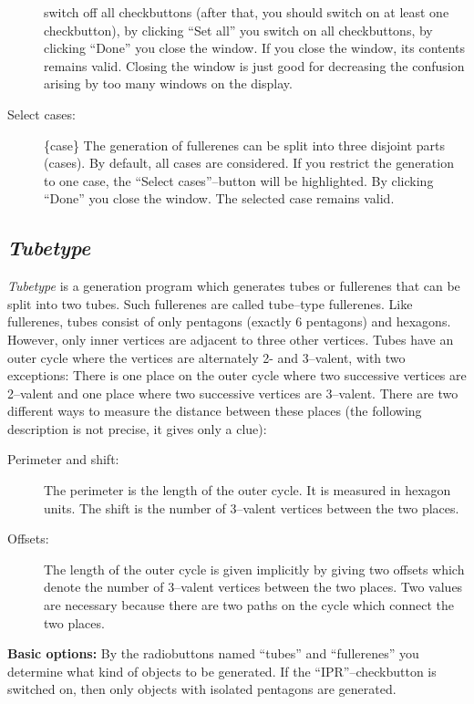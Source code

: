 \documentclass[a4paper]{article}
\begin{document}
\begin{description}
switch off all checkbuttons (after that, you should switch on at least one
checkbutton), by clicking ``Set all'' you switch on all
checkbuttons, by clicking ``Done'' you close the window. If you close the
window, its contents remains valid. Closing the window is just good for
decreasing the confusion arising by too many windows on the display.
\item[Select cases:] \{case\} The generation of fullerenes can be split into
three disjoint parts (cases). By default, all cases are considered. If you
restrict the generation to one case, the ``Select cases''--button will be
highlighted. By clicking ``Done'' you close the window. The selected case
remains valid.
\end{description} 
    
\subsection{\textit{Tubetype}}

\textit{Tubetype} is a generation program which generates tubes or fullerenes
that can be split into two tubes. Such fullerenes are called tube--type
fullerenes. Like fullerenes, tubes consist of only pentagons 
(exactly 6 pentagons) and hexagons.
However, only inner vertices are adjacent to three other vertices. 
Tubes have an outer cycle where the vertices are alternately 2- and 3--valent, 
with two exceptions:
There is one place on the outer cycle where two successive vertices are 
2--valent and one place where two successive vertices are 3--valent. There
are two different ways to measure the distance between these places (the
following description is not precise, it gives only a clue):
\begin{description}
\item[Perimeter and shift:] The perimeter is the length of the outer cycle.
It is measured in hexagon units. The shift is the number of 3--valent vertices
between the two places.
\item[Offsets:] The length of the outer cycle is given implicitly by giving
two offsets which denote the number of 3--valent vertices between the two
places. Two values are necessary because there are two paths on the
cycle which connect the two places.
\end{description}

\noindent\textbf{Basic options:} 
By the radiobuttons named ``tubes'' and ``fullerenes''
you determine what kind of objects to be generated. If the ``IPR''--checkbutton
is switched on, then only objects with isolated pentagons are generated.
\end{document}
